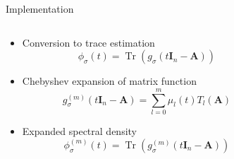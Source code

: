 \documentclass[aspectratio=169, 12pt]{beamer}
\newcommand{\mtx}[1]{\boldsymbol{#1}}
\DeclareMathOperator{\Tr}{Tr}
\begin{document}
\begin{frame}{Implementation}
    \begin{columns}
        \begin{column}{0.55\textwidth}
            \begin{itemize}
                \item Conversion to trace estimation
                \begin{equation}
                    \phi_{\sigma}(t) = \Tr(g_{\sigma}(t \mtx{I}_n - \mtx{A}))
                \end{equation}
                \item Chebyshev expansion of matrix function
                \begin{equation}
                    g_{\sigma}^{(m)}(t \mtx{I}_n - \mtx{A}) = \sum_{l=0}^m \mu_l(t) T_l(\mtx{A})
                \end{equation}
                \item Expanded spectral density
                \begin{equation}
                    \phi_{\sigma}^{(m)}(t) = \Tr(g_{\sigma}^{(m)}(t \mtx{I}_n - \mtx{A}))
                \end{equation}
            \end{itemize}
        \end{column}
        \begin{column}{0.45\textwidth}
            \scalebox{0.65}{}
        \end{column}
    \end{columns}
\end{frame}
\end{document}
